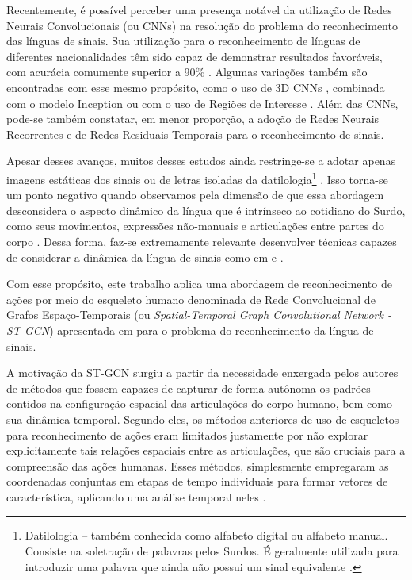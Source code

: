Recentemente, é possível perceber uma presença notável da utilização de Redes Neurais Convolucionais (ou CNNs) na resolução do problema do reconhecimento das línguas de sinais. Sua utilização para o reconhecimento de línguas de diferentes nacionalidades têm sido capaz de demonstrar resultados favoráveis, com acurácia comumente superior a 90\%  \cite{shanta-2018, ji-2017, taskiran-2018, rao-2018}. Algumas variações também são encontradas com esse mesmo propósito, como o uso de 3D CNNs \cite{elbadawy-2017}, combinada com o modelo Inception \cite{das-2018} ou com o uso de Regiões de Interesse \cite{sajanraj-2018}. Além das CNNs, pode-se também constatar, em menor proporção, a adoção de Redes Neurais Recorrentes \cite{konstantinidis-2018} e de Redes Residuais Temporais \cite{pigou-2017} para o reconhecimento de sinais.

Apesar desses avanços, muitos desses estudos ainda restringe-se a adotar apenas imagens estáticas dos sinais ou de letras isoladas da datilologia\footnote{
     Datilologia – também conhecida como alfabeto digital ou alfabeto manual. Consiste na soletração de palavras pelos Surdos. É geralmente utilizada para introduzir uma palavra que ainda não possui um sinal equivalente \cite{quadros-2004, pereira-choi-2011}.
} \cite{shanta-2018, taskiran-2018, elbadawy-2017, das-2018, sajanraj-2018}. Isso torna-se um ponto negativo quando observamos pela dimensão de que essa abordagem desconsidera o aspecto dinâmico da língua que é intrínseco ao cotidiano do Surdo, como seus movimentos, expressões não-manuais e articulações entre partes do corpo \cite{quadros-2004}. Dessa forma, faz-se extremamente relevante desenvolver técnicas capazes de considerar a dinâmica da língua de sinais como em \cite{konstantinidis-2018} e \cite{pigou-2017}. 

Com esse propósito, este trabalho aplica uma abordagem de reconhecimento de ações por meio do esqueleto humano denominada de Rede Convolucional de Grafos Espaço-Temporais (ou \textit{Spatial-Temporal Graph Convolutional Network - ST-GCN}) apresentada em \cite{st-gcn-2018} para o problema do reconhecimento da língua de sinais. 

A motivação da ST-GCN surgiu a partir da necessidade enxergada pelos autores de métodos que fossem capazes de capturar de forma autônoma os padrões contidos na configuração espacial das articulações do corpo humano, bem como sua dinâmica temporal. Segundo eles, os métodos anteriores de uso de esqueletos para reconhecimento de ações eram limitados justamente por não explorar explicitamente tais relações espaciais entre as articulações, que são cruciais para a compreensão das ações humanas. Esses métodos, simplesmente empregaram as coordenadas conjuntas em etapas de tempo individuais para formar vetores de característica, aplicando uma análise temporal neles \cite{st-gcn-2018, wang-2012, fernando-2015}.

